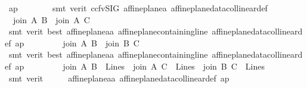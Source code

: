 \begin{isabellebody}
\ ap\isanewline
\ \ \ \ \ \ \isamarkupfalse%
\ {\isacharparenleft}{\kern0pt}smt\ {\isacharparenleft}{\kern0pt}verit{\isacharcomma}{\kern0pt}\ ccfv{\isacharunderscore}{\kern0pt}SIG{\isacharparenright}{\kern0pt}\ affine{\isacharunderscore}{\kern0pt}plane{\isachardot}{\kern0pt}a{}\ affine{\isacharunderscore}{\kern0pt}plane{\isacharunderscore}{\kern0pt}data{\isachardot}{\kern0pt}collinear{\isacharunderscore}{\kern0pt}def{\isacharparenright}{\kern0pt}\isanewline
\ \ \ \ \ \ \isamarkupfalse%
\ {}{\isacharcolon}{\kern0pt}\ {\isachardoublequoteopen}join\ A\ B\ {\isasymnoteq}\ join\ A\ C{\isachardoublequoteclose}\ \isamarkupfalse%
\ {}\ {}\ {}\ {}\isanewline
\ \ \ \ \ \ \ \ \isamarkupfalse%
\ {\isacharparenleft}{\kern0pt}smt\ {\isacharparenleft}{\kern0pt}verit{\isacharcomma}{\kern0pt}\ best{\isacharparenright}{\kern0pt}\ affine{\isacharunderscore}{\kern0pt}plane{\isachardot}{\kern0pt}a{}a\ affine{\isacharunderscore}{\kern0pt}plane{\isachardot}{\kern0pt}containing{\isacharunderscore}{\kern0pt}line\ affine{\isacharunderscore}{\kern0pt}plane{\isacharunderscore}{\kern0pt}data{\isachardot}{\kern0pt}collinear{\isacharunderscore}{\kern0pt}def\ ap{\isacharparenright}{\kern0pt}\isanewline
\ \ \ \ \ \ \isamarkupfalse%
\ {}{\isacharcolon}{\kern0pt}\ {\isachardoublequoteopen}join\ A\ B\ {\isasymnoteq}\ join\ B\ C{\isachardoublequoteclose}\ \isamarkupfalse%
\ {}\ {}\ {}\ {}\isanewline
\ \ \ \ \ \ \ \ \isamarkupfalse%
\ {\isacharparenleft}{\kern0pt}smt\ {\isacharparenleft}{\kern0pt}verit{\isacharcomma}{\kern0pt}\ best{\isacharparenright}{\kern0pt}\ affine{\isacharunderscore}{\kern0pt}plane{\isachardot}{\kern0pt}a{}a\ affine{\isacharunderscore}{\kern0pt}plane{\isachardot}{\kern0pt}containing{\isacharunderscore}{\kern0pt}line\ affine{\isacharunderscore}{\kern0pt}plane{\isacharunderscore}{\kern0pt}data{\isachardot}{\kern0pt}collinear{\isacharunderscore}{\kern0pt}def\ ap{\isacharparenright}{\kern0pt}\isanewline
\ \ \ \ \ \ \isamarkupfalse%
\ {}{}{\isacharcolon}{\kern0pt}\ {\isachardoublequoteopen}join\ A\ B\ {\isasymin}\ Lines\ {\isasymand}\ join\ A\ C\ {\isasymin}\ Lines\ {\isasymand}\ join\ B\ C\ {\isasymin}\ Lines{\isachardoublequoteclose}\isanewline
\ \ \ \ \ \ \ \ \isamarkupfalse%
\ {\isacharparenleft}{\kern0pt}smt\ {\isacharparenleft}{\kern0pt}verit{\isacharparenright}{\kern0pt}\ {\isachardoublequoteopen}{}{\isachardoublequoteclose}\ {\isachardoublequoteopen}{}{\isachardoublequoteclose}\ {\isachardoublequoteopen}{}{\isachardoublequoteclose}\ {\isachardoublequoteopen}{}{\isachardoublequoteclose}\ {\isachardoublequoteopen}{}{\isachardoublequoteclose}\ affine{\isacharunderscore}{\kern0pt}plane{\isachardot}{\kern0pt}a{}a\ affine{\isacharunderscore}{\kern0pt}plane{\isacharunderscore}{\kern0pt}data{\isachardot}{\kern0pt}collinear{\isacharunderscore}{\kern0pt}def\ ap{\isacharparenright}{\kern0pt}\ \isanewline

\end{isabellebody}
